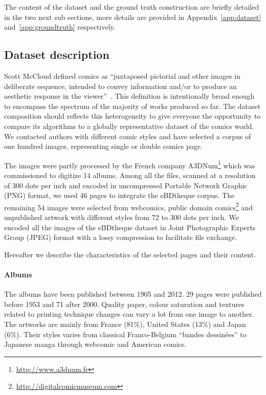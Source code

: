 The content of the dataset and the ground truth construction are briefly detailed in the two next sub sections, more details are provided in Appendix~\ref{app:dataset} and~\ref{app:groundtruth} respectively.



\subsection{Dataset description} %
\label{sec:dataset_description}


Scott McCloud defined comics as ``juxtaposed pictorial and other images in deliberate sequence, intended to convey information and/or to produce an aesthetic response in the viewer''~\cite{mccloud1994understanding}.
This definition is intentionally broad enough to encompass the spectrum of the majority of works produced so far.
The dataset composition should reflects this heterogeneity to give everyone the opportunity
to compare its algorithms to a globally representative dataset of the comics world.
We contacted authors with different comic styles and have selected a corpus of one hundred images, representing single or double comics page.

The images were partly processed by the French company A3DNum\footnote{\url{http://www.a3dnum.fr}} which was commissioned to digitize 14 albums.
Among all the files, scanned at a resolution of 300 dots per inch and encoded in uncompressed Portable Network Graphic (PNG) format, we used 46 pages to integrate the eBDtheque corpus.
The remaining 54 images were selected from webcomics, public domain comics\footnote{\url{http://digitalcomicmuseum.com}} and unpublished artwork with different styles from 72 to 300 dots per inch.
We encoded all the images of the eBDtheque dataset in Joint Photographic Experts Group (JPEG) format with a lossy compression to facilitate file exchange.

Hereafter we describe the characteristics of the selected pages and their content.


\paragraph{Albums} %
 \label{par:albums}
 The albums have been published between 1905 and 2012.
 29 pages were published before 1953 and 71 after 2000.
 Quality paper, colour saturation and textures related to printing technique changes can vary a lot from one image to another.
 The artworks are mainly from France (81\%), United States (13\%) and Japan (6\%).
 Their styles varies from classical Franco-Belgium ``bandes dessinées'' to Japanese manga through webcomic and American comics.

